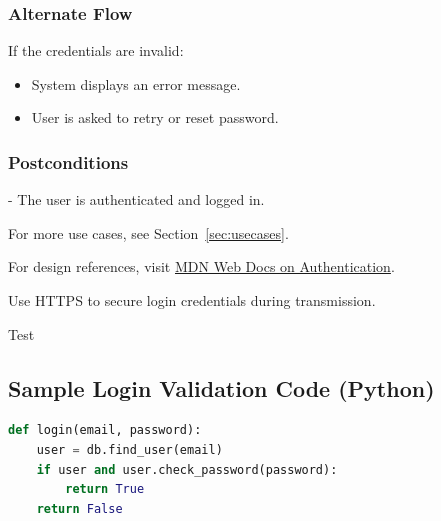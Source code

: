 \documentclass[12pt]{article}
\begin{document}
\subsubsection*{Alternate Flow}
If the credentials are invalid:
\begin{itemize}
    \item System displays an error message.
    \item User is asked to retry or reset password.
\end{itemize}

\subsubsection*{Postconditions}
- The user is authenticated and logged in.

For more use cases, see Section~\ref{sec:usecases}.

For design references, visit \href{https://developer.mozilla.org/en-US/docs/Web/HTTP/Authentication}{MDN Web Docs on Authentication}.

\begin{noteBox}
Use HTTPS to secure login credentials during transmission.
\end{noteBox}

\begin{noteBox}
Test
\end{noteBox}

\subsection*{Sample Login Validation Code (Python)}

\begin{lstlisting}[language=Python, caption=Simple login validation]
def login(email, password):
    user = db.find_user(email)
    if user and user.check_password(password):
        return True
    return False
\end{lstlisting}

\end{document}
